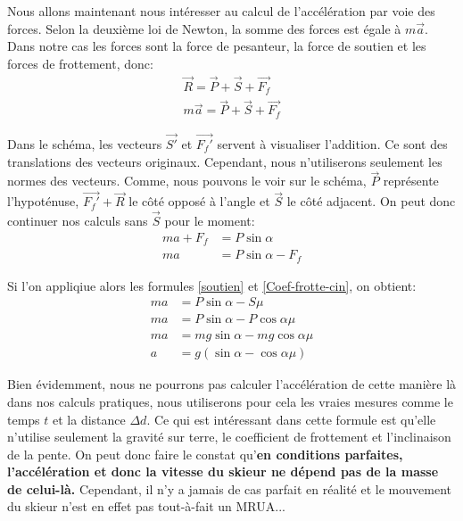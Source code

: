 \documentclass{article}
\begin{document}
\vspace{0.5cm}


Nous allons maintenant nous intéresser au calcul de l'accélération par voie des forces. Selon la deuxième loi de Newton, la somme des forces est égale à $m\vec{a}$. Dans notre cas les forces sont la force de pesanteur, la force de soutien et les forces de frottement, donc:
\begin{align}
    \nonumber
    \vec{R} = \vec{P} + \vec{S} + \vec{F_f} \\
    \label{ma-somm}
    m\vec{a} = \vec{P} + \vec{S} + \vec{F_f}
\end{align}

Dans le schéma, les vecteurs $\vec{S'}$ et $\vec{F_f'}$ servent à visualiser l'addition. Ce sont des translations des vecteurs originaux. 
\newline Cependant, nous n'utiliserons seulement les normes des vecteurs. Comme, nous pouvons le voir sur le schéma, $\vec{P}$ représente l'hypoténuse, $\vec{F_f'}+\vec{R}$ le côté opposé à l'angle et $\vec{S}$ le côté adjacent. On peut donc continuer nos calculs sans $\vec{S}$ pour le moment:
\begin{align}
    \nonumber
    ma+F_f &= P\sin{\alpha} \\
    \label{ma-Pes-frott}
    ma &= P\sin{\alpha} - F_f
\end{align}

Si l'on appliqiue alors les formules \ref{soutien} et \ref{Coef-frotte-cin}, on obtient:
\begin{align}
    \nonumber
    ma &= P\sin{\alpha} - S\mu \\
    \nonumber
    ma &= P\sin{\alpha} - P\cos{\alpha}\mu \\
    \nonumber
    ma &= mg\sin{\alpha} - mg\cos{\alpha}\mu \\
    \label{acc-cond-parf}
    a  &= g(\sin{\alpha}-\cos{\alpha}\mu)
\end{align}

Bien évidemment, nous ne pourrons pas calculer l'accélération de cette manière là dans nos calculs pratiques, nous utiliserons pour cela les vraies mesures comme le temps $t$ et la distance $\Delta d$.
\newline Ce qui est intéressant dans cette formule est qu'elle n'utilise seulement la gravité sur terre, le coefficient de frottement et l'inclinaison de la pente. On peut donc faire le constat qu'\textbf{en conditions parfaites, l'accélération et donc la vitesse du skieur ne dépend pas de la masse de celui-là.}
\vspace{0.3cm}
\newline Cependant, il n'y a jamais de cas parfait en réalité et le mouvement du skieur n'est en effet pas tout-à-fait un MRUA...
\end{document}
